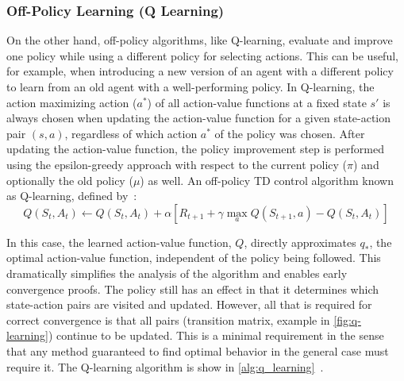 \documentclass[../xlapes02]{subfiles}
\begin{document}
    \subsubsection{Off-Policy Learning (Q Learning)}\label{sec:td-q-learning}
    On the other hand, off-policy algorithms, like Q-learning, evaluate and improve one policy while using a different policy for selecting actions. This can be useful, for example, when introducing a new version of an agent with a different policy to learn from an old agent with a well-performing policy. In Q-learning, the action maximizing action ($ a^* $) of all action-value functions at a fixed state $ s' $ is always chosen when updating the action-value function for a given state-action pair $ (s, a) $, regardless of which action $ a^* $ of the policy was chosen. After updating the action-value function, the policy improvement step is performed using the epsilon-greedy approach with respect to the current policy ($ \pi $) and optionally the old policy ($ \mu $) as well. An off-policy TD control algorithm known as Q-learning, defined by~\cite{FITMT25127, sutton2018reinforcement}:
    \begin{equation}
        \label{eq:q-learning}
        Q(S_t,A_t)\leftarrow Q(S_t,A_t)+\alpha\left[R_{t+1}+\gamma\max_a Q(S_{t+1},a)-Q(S_t,A_t)\right]
    \end{equation}

    In this case, the learned action-value function, $Q$, directly approximates $q_*$, the optimal action-value function, independent of the policy being followed. This dramatically simplifies the analysis of the algorithm and enables early convergence proofs. The policy still has an effect in that it determines which state-action pairs are visited and updated. However, all that is required for correct convergence is that all pairs (transition matrix, example in \cref{fig:q-learning}) continue to be updated. This is a minimal requirement in the sense that any method guaranteed to find optimal behavior in the general case must require it. The Q-learning algorithm is show in \cref{alg:q_learning}~\cite{rl-course-david-silver, sutton2018reinforcement}.

\end{document}
